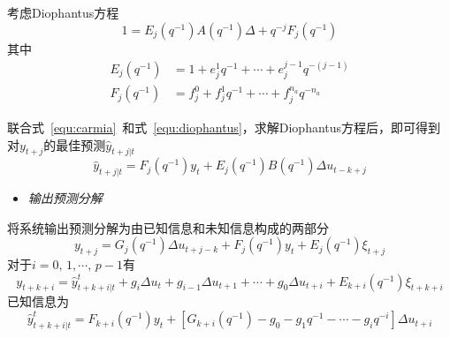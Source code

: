 考虑Diophantus方程
\begin{equation}
\label{equ:diophantus}
1=E_j(q^{-1})A(q^{-1})\Delta+q^{-j}F_j(q^{-1})
\end{equation}
其中
\begin{align*}
E_{j}(q^{-1}) &= 1+e^{1}_{j}q^{-1}+\cdots+e^{j-1}_{j}q^{-(j-1)}\\
F_{j}(q^{-1}) &= f^{0}_{j}+f^{1}_{j}q^{-1}+\cdots+f^{n_{a}}_{j}q^{-n_{a}}
\end{align*}

联合式~\ref{equ:carmia}~和式~\ref{equ:diophantus}，求解Diophantus方程后，即可得到对$y_{t+j}$的最佳预测$\hat{y}_{t+j|t}$
\begin{equation}
\hat{y}_{t+j|t}=F_{j}(q^{-1})y_t+E_{j}(q^{-1})B(q^{-1})\Delta{u_{t-k+j}}
\end{equation}

\begin{itemize}
\item{\emph{输出预测分解}}
\end{itemize}

将系统输出预测分解为由已知信息和未知信息构成的两部分
\begin{equation}
y_{t+j} = G_{j}(q^{-1})\Delta{u_{t+j-k}}+F_{j}(q^{-1})y_{t}+E_{j}(q^{-1})\xi_{t+j}
\end{equation}
对于$i=0,\,1,\cdots,\,p-1$有
\begin{equation}
y_{t+k+i}=\hat{y}^{t}_{t+k+i|t}+g_{i}\Delta{u_{t}}+g_{i-1}\Delta{u_{t+1}}+\cdots+g_{0}\Delta{u_{t+i}}+E_{k+i}(q^{-1})\xi_{t+k+i}
\end{equation}
已知信息为
\begin{equation}
\hat{y}^{t}_{t+k+i|t} = F_{k+i}(q^{-1})y_{t}+[G_{k+i}(q^{-1})-g_{0}-g_{1}q^{-1}-\cdots-g_{i}q^{-i}]\Delta{u_{t+i}}
\end{equation}

